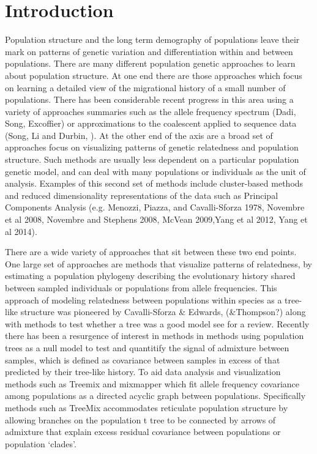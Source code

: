 \documentclass[12pt]{article}
\begin{document}
\section*{Introduction}
Population structure and the long term demography of populations leave their mark on patterns of genetic variation and differentiation within and between populations. 
There are many different population genetic approaches to learn about population structure. At one end there are those approaches which focus on learning a detailed view of the migrational history of a small number of populations. There has been considerable recent progress in this area using a variety of approaches summaries such as the allele frequency spectrum (Dadi, Song, Excoffier) or approximations to the coalescent applied to sequence data (Song, Li and Durbin, ). At the other end of the axis are a broad set of approaches focus on visualizing patterns of genetic relatedness and population structure. Such methods are usually less dependent on a particular population genetic model, and can deal with many populations or individuals as the unit of analysis. Examples of this second set of methods include cluster-based methods \citep{STRUCTURE, ADMIXTURE, FINESTRUCTURE} and reduced dimensionality representations of the data such as Principal Components Analysis (e.g. Menozzi, Piazza, and Cavalli-Sforza 1978, Novembre et al 2008, Novembre and Stephens 2008, McVean 2009,Yang et al 2012, Yang et al 2014).

There are a wide variety of approaches that sit between these two end points. One large set of approaches are methods that visualize patterns of relatedness, by estimating a population phylogeny describing the evolutionary history shared between sampled individuals or populations from allele frequencies.  This approach of modeling relatedness between populations within species as a tree-like structure was pioneered by Cavalli-Sforza \& Edwards,  (\&Thompson?) along with methods to test whether a tree was a good model \citep{treeness} see  \citep{Felsenstein} for a review. 
Recently there has been a resurgence of interest in methods in methods using population trees as a null model to test and quantitify the signal of admixture between samples, which is defined as covariance between samples in excess of that predicted by their tree-like history. To aid data analysis and visualization methods such as Treemix \citep{Pickrell} and mixmapper which fit allele frequency covariance among populations as a directed acyclic graph between populations. Specifically methods such as TreeMix accommodates reticulate population structure by allowing branches on the population t tree to be connected by arrows of admixture that explain excess residual covariance between populations or population `clades'.
\end{document}
